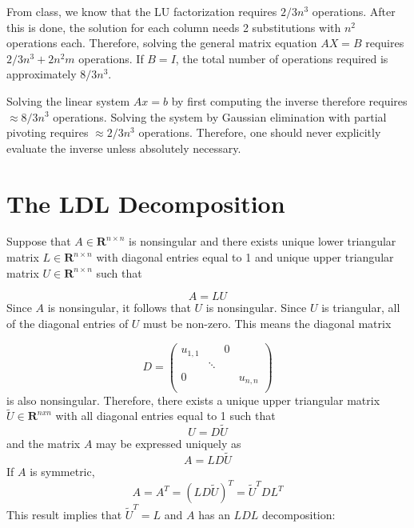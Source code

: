 \documentclass[11pt]{article} %
\begin{document}
From class, we know that the LU factorization requires $2/3 n^3$ operations. After this is done,  the solution for each column needs 2 substitutions with  $n^2$ operations each. Therefore, solving the general matrix equation $AX=B$ requires $2/3 n^3 +  2n^2 m$ operations. If $B=I$, the total number of operations required is approximately $8/3 n^3$.

Solving the linear system $Ax=b$ by first computing the inverse therefore requires $\approx 8/3n^3$ operations. Solving the system by Gaussian elimination with partial pivoting requires $\approx 2/3 n^3$ operations. Therefore, one should never explicitly evaluate the inverse unless absolutely necessary.

\section{The LDL Decomposition}
Suppose that $A \in \mathbf{R}^{n×n}$ is nonsingular and there exists unique lower triangular matrix $L \in \mathbf{R}^{n×n}$ with diagonal entries equal to 1 and unique upper triangular matrix $U \in \mathbf{R}^{n×n}$ such that

\begin{equation}
A = LU
\end{equation}
Since $A$ is nonsingular, it follows that $U$ is nonsingular. Since $U$ is triangular, all of the diagonal entries of $U$ must be non-zero. This means the diagonal matrix

\begin{equation}
D=
 \begin{pmatrix}
  u_{1,1}  & &0 \\
 & \ddots &  \\
  0  &   &   & u_{n,n}  \\
 \end{pmatrix}
\end{equation}
is also nonsingular. Therefore, there exists a unique upper triangular matrix $\tilde{U} \in \mathbf{R}^{nxn}$ with all diagonal entries equal to 1 such that
\begin{equation}
U = D \tilde{U}
\end{equation}
and the matrix $A$ may be expressed uniquely as
\begin{equation}
A = L D \tilde{U}
\end{equation}
If $A$ is symmetric,
\begin{equation}
A = A^{T} = (L D \tilde{U})^{T} = \tilde{U}^{T} D L^{T}
\end{equation}
This result implies that $\tilde{U}^{T}=L$ and $A$ has an $LDL$ decomposition:
\end{document}
